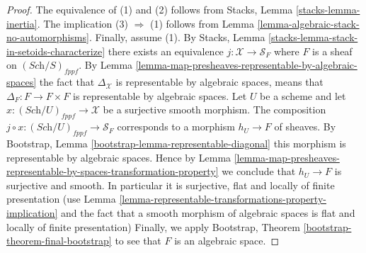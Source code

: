 \begin{proof}
The equivalence of (1) and (2) follows from
Stacks, Lemma \ref{stacks-lemma-inertia}.
The implication (3) $\Rightarrow$ (1) follows from
Lemma \ref{lemma-algebraic-stack-no-automorphisms}.
Finally, assume (1). By
Stacks, Lemma \ref{stacks-lemma-stack-in-setoids-characterize}
there exists an equivalence $j : \mathcal{X} \to \mathcal{S}_F$
where $F$ is a sheaf on $(\textit{Sch}/S)_{fppf}$.  By
Lemma \ref{lemma-map-presheaves-representable-by-algebraic-spaces}
the fact that $\Delta_\mathcal{X}$ is representable by algebraic
spaces, means that $\Delta_F : F \to F \times F$
is representable by algebraic spaces.
Let $U$ be a scheme and let $x : (\textit{Sch}/U)_{fppf} \to \mathcal{X}$
be a surjective smooth morphism. The composition
$j \circ x : (\textit{Sch}/U)_{fppf} \to \mathcal{S}_F$
corresponds to a morphism $h_U \to F$ of sheaves. By
Bootstrap, Lemma \ref{bootstrap-lemma-representable-diagonal}
this morphism is representable by algebraic spaces.
Hence by
Lemma
\ref{lemma-map-presheaves-representable-by-spaces-transformation-property}
we conclude that $h_U \to F$ is surjective and smooth.
In particular it is surjective, flat and locally of finite presentation
(use
Lemma \ref{lemma-representable-transformations-property-implication}
and the fact that a smooth morphism of algebraic spaces is flat and
locally of finite presentation)
Finally, we apply
Bootstrap, Theorem \ref{bootstrap-theorem-final-bootstrap}
to see that $F$ is an algebraic space.
\end{proof}

















